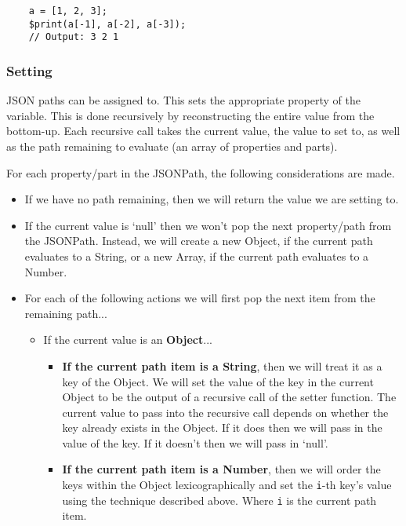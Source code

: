 \begin{verbatim}
    a = [1, 2, 3];
    $print(a[-1], a[-2], a[-3]);
    // Output: 3 2 1
\end{verbatim}

\subsubsection{Setting}

JSON paths can be assigned to. This sets the appropriate property of the variable. This is done recursively by reconstructing the entire value from the bottom-up. Each recursive call takes the current value, the value to set to, as well as the path remaining to evaluate (an array of properties and parts).

\begin{center}
    For each property/part in the JSONPath, the following considerations are made.
    \begin{itemize}
        \item If we have no path remaining, then we will return the value we are setting to.
        \item If the current value is `null' then we won't pop the next property/path from the JSONPath. Instead, we will create a new Object, if the current path evaluates to a String, or a new Array, if the current path evaluates to a Number.
        \item For each of the following actions we will first pop the next item from the remaining path...
        \begin{itemize}
            \item If the current value is an \textbf{Object}...
            \begin{itemize}
                \item \textbf{If the current path item is a String}, then we will treat it as a key of the Object. We will set the value of the key in the current Object to be the output of a recursive call of the setter function. The current value to pass into the recursive call depends on whether the key already exists in the Object. If it does then we will pass in the value of the key. If it doesn't then we will pass in `null'.
                \item \textbf{If the current path item is a Number}, then we will order the keys within the Object lexicographically and set the \verb|i|-th key's value using the technique described above. Where \verb|i| is the current path item.
            \end{itemize}

\end{itemize}
\end{itemize}
\end{center}
